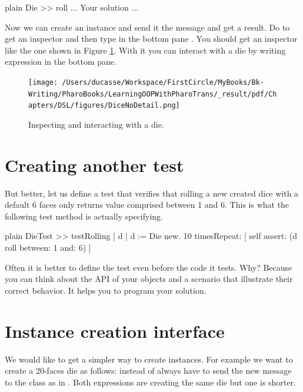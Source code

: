 \documentclass[10pt,twoside,english]{_support/latex/sbabook/sbabook}
\begin{document}
\begin{displaycode}{plain}
Die >> roll
	... Your solution ...
\end{displaycode}

Now we can create an instance  and send it the message   and get a result.
Do  to get an inspector and then type in the bottom pane .
You should get an inspector like the one shown in Figure \ref{figDiceNoDetail}. With it you can interact with a die by writing expression in the bottom pane.


\begin{figure}

\begin{center}
\texttt{[image: /Users/ducasse/Workspace/FirstCircle/MyBooks/Bk-Writing/PharoBooks/LearningOOPWithPharoTrans/\_result/pdf/Chapters/DSL/figures/DiceNoDetail.png]}\caption{Inspecting and interacting with a die.\label{figDiceNoDetail}}\end{center}
\end{figure}


 
\section{Creating another test}
But better, let us define a test that verifies that rolling a new created dice with a default 6 faces only returns 
value comprised between 1 and 6. This is what the following test method is actually specifying.
 

\begin{displaycode}{plain}
DieTest >> testRolling
	| d |
	d := Die new.
	10 timesRepeat: [ self assert: (d roll between: 1 and: 6) ]
\end{displaycode}

\begin{important}
Often it is better to define the test even before the code it tests. Why? Because you can think about the API of your objects and a scenario that illustrate their correct behavior. It helps you to program your solution.
\end{important}
\section{Instance creation interface}
We would like to get a simpler way to create  instances. For example we want to create a 20-faces die as follows:  instead of always have to send the new message to the class as in .
Both expressions are creating the same die but one is shorter.
\end{document}
